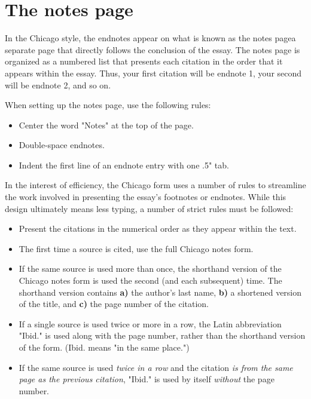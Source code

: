 \section{The notes page}

In the Chicago style, the endnotes appear on what is known as the notes 
page\textemdash a separate page that directly follows the conclusion of the essay. The 
notes page is organized as a numbered list that presents each citation in the order that 
it appears within the essay. Thus, your first citation will be endnote 1, your second will 
be endnote 2, and so on.

When setting up the notes page, use the following rules:

\begin{itemize}
\item Center the word "Notes" at the top of the page.
\item Double-space endnotes.
\item Indent the first line of an endnote entry with one .5" tab.
\end{itemize}

In the interest of efficiency, the Chicago form uses a number of rules to streamline the 
work involved in presenting the essay's footnotes or endnotes. While this design 
ultimately means less typing, a number of strict rules must be followed:

\begin{itemize}
\item Present the citations in the numerical order as they appear within the text.

\item The first time a source is cited, use the full Chicago notes form.

\item If the same source is used more than once, the shorthand version of the Chicago 
notes form is used the second (and each subsequent) time. The shorthand version 
contains \textbf{a)} the author's last name, \textbf{b)} a shortened version of the title, 
and \textbf{c)} the page number of the citation.

\item If a single source is used twice or more in a row, the Latin abbreviation "Ibid." is 
used along with the page number, rather than the shorthand version of the form. 
(Ibid. means "in the same place.")

\item If the same source is used \emph{twice in a row} and the citation \emph{is from 
the same page as the previous citation}, "Ibid." is used by itself \emph{without} the 
page number. 
\end{itemize}

